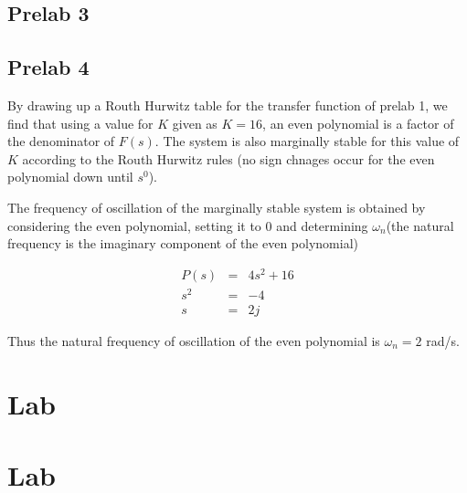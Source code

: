 \documentclass[12pt, a4paper]{article}
\begin{document}

		\subsection{Prelab 3} %
		\label{sub:prelab_3}
		

		\subsection{Prelab 4} %
		\label{sub:prelab_4}
		By drawing up a Routh Hurwitz table for the transfer function of prelab 1, we find that using a value for $K$ given as $K=16$, an even polynomial is a factor of the denominator of $F(s)$. The system is also marginally stable for this value of $K$ according to the Routh Hurwitz rules (no sign chnages occur for the even polynomial down until $s^0$).

		The frequency of oscillation of the marginally stable system is obtained by considering the even polynomial, setting it to 0 and determining $\omega_n $(the natural frequency is the imaginary component of the even polynomial)

		\begin{equation}
			\begin{array}{rcl}
				P(s) & = & 4s^2 +16\\
				s^2	 & = &-4\\
				s    & = & 2j
			\end{array}
		\end{equation}

		Thus the natural frequency of oscillation of the even polynomial is $\omega_n = 2$ rad/s.
		

	\section{Lab} %
	\label{sec:lab}
	

	\section{Lab} %
	\label{sec:lab}
	
\end{document}
